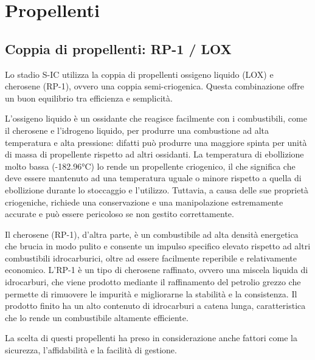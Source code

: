 \section{Propellenti}
\label{sec:propellenti}

\subsection{Coppia di propellenti: RP-1 / LOX}
\label{subsec:coppia_propellenti}

Lo stadio S-IC utilizza la coppia di propellenti ossigeno liquido (LOX) e cherosene (RP-1), ovvero una coppia semi-criogenica. Questa combinazione offre un buon equilibrio tra efficienza e semplicità.

L'ossigeno liquido è un ossidante che reagisce facilmente con i combustibili, come il cherosene e l'idrogeno liquido, per produrre una combustione ad alta temperatura e alta pressione: difatti può produrre una maggiore spinta per unità di massa di propellente rispetto ad altri ossidanti.
La temperatura di ebollizione molto bassa (-182.96°C) lo rende un propellente criogenico, il che significa che deve essere mantenuto ad una temperatura uguale o minore rispetto a quella di ebollizione durante lo stoccaggio e l'utilizzo.
Tuttavia, a causa delle sue proprietà criogeniche, richiede una conservazione e una manipolazione estremamente accurate e può essere pericoloso se non gestito correttamente.

Il cherosene (RP-1), d'altra parte, è un combustibile ad alta densità energetica che brucia in modo pulito e consente un impulso specifico elevato rispetto ad altri combustibili idrocarburici, oltre ad essere facilmente reperibile e relativamente economico.
L'RP-1 è un tipo di cherosene raffinato, ovvero una miscela liquida di idrocarburi, che viene prodotto mediante il raffinamento del petrolio grezzo che permette di rimuovere le impurità e migliorarne la stabilità e la consistenza. Il prodotto finito ha un alto contenuto di idrocarburi a catena lunga, caratteristica che lo rende un combustibile altamente efficiente.

La scelta di questi propellenti ha preso in considerazione anche fattori come la sicurezza, l'affidabilità e la facilità di gestione.

